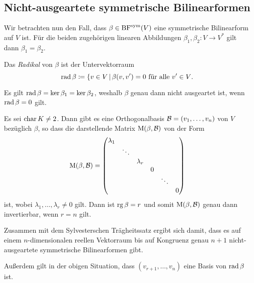 \subsection{Nicht-ausgeartete symmetrische Bilinearformen}

Wir betrachten nun den Fall, dass $\beta \in \operatorname{BF}^{\operatorname{sym}}(V)$ eine symmetrische Bilinearform auf $V$ ist.
Für die beiden zugehörigen linearen Abbildungen $\beta_1, \beta_2 \colon V \to V^*$ gilt dann $\beta_1 = \beta_2$.

\begin{definition}
  Das \emph{Radikal} von $\beta$ ist der Untervektorraum
  \[
              \operatorname{rad} \beta
    \coloneqq \{v \in V \,|\, \text{$\beta(v,v') = 0$ für alle $v' \in V$}.
  \]
\end{definition}

Es gilt $\operatorname{rad} \beta = \ker \beta_1 = \ker \beta_2$, weshalb $\beta$ genau dann nicht ausgeartet ist, wenn $\operatorname{rad} \beta = 0$ gilt.

\begin{example}
  Es sei $\operatorname{char} K \neq 2$.
  Dann gibt es eine Orthogonalbasis $\mathcal{B} = (v_1, \dotsc, v_n)$ von $V$ bezüglich $\beta$, so dass die darstellende Matrix $\operatorname{M}(\beta, \mathcal{B})$ von der Form
  \[
      \operatorname{M}(\beta, \mathcal{B})
    = \begin{pmatrix}
        \lambda_1 &         &           &   &         &   \\
                  & \ddots  &           &   &         &   \\
                  &         & \lambda_r &   &         &   \\
                  &         &           & 0 &         &   \\
                  &         &           &   & \ddots  &   \\
                  &         &           &   &         & 0
      \end{pmatrix}
  \]
  ist, wobei $\lambda_1, \dotsc, \lambda_r \neq 0$ gilt.
  Dann ist $\operatorname{rg} \beta = r$ und somit $\operatorname{M}(\beta, \mathcal{B})$ genau dann invertierbar, wenn $r = n$ gilt.
  
  Zusammen mit dem Sylvesterschen Trägheitssatz ergibt sich damit, dass es auf einem $n$-dimensionalen reellen Vektorraum bis auf Kongruenz genau $n+1$ nicht-ausgeartete symmetrische Bilinearformen gibt.
  
  Außerdem gilt in der obigen Situation, dass $(v_{r+1}, \dotsc, v_n)$ eine Basis von $\operatorname{rad} \beta$ ist.
\end{example}

